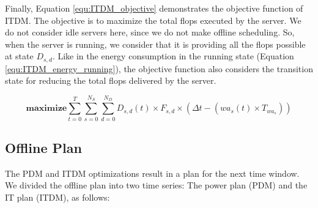 Finally, Equation \ref{equ:ITDM_objective} demonstrates the objective function of ITDM. The objective is to maximize the total flops executed by the server. We do not consider idle servers here, since we do not make offline scheduling. So, when the server is running, we consider that it is providing all the flops possible at state $D_{s,d}$. Like in the energy consumption in the running state (Equation \ref{equ:ITDM_energy_running}), the objective function also considers the transition state for reducing the total flops delivered by the server.

\begin{equation}
    \label{equ:ITDM_objective}
    \mathbf{maximize} \sum_{t=0}^{T}\sum_{s=0}^{N_{S}}\sum_{d=0}^{N_{D}} D_{s,d}(t) \times F_{s,d} \times (\Delta t - (wa_{s}(t) \times T_{wa_{s}}))
\end{equation}



\subsection{Offline Plan}

The PDM and ITDM optimizations result in a plan for the next time window. We divided the offline plan into two time series: The power plan (PDM) and the IT plan (ITDM), as follows:

